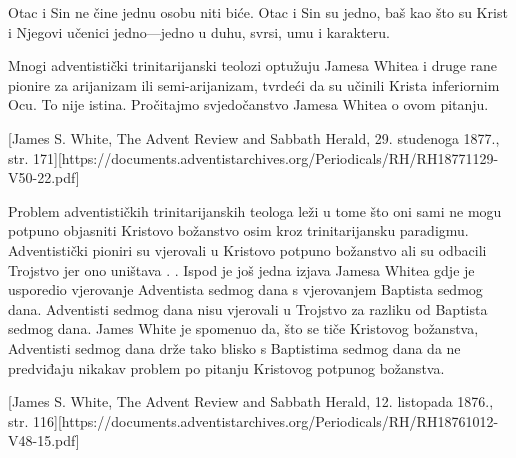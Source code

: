 Otac i Sin ne čine jednu osobu niti biće. Otac i Sin su jedno, baš kao što su Krist i Njegovi učenici jedno—jedno u duhu, svrsi, umu i karakteru.

Mnogi adventistički trinitarijanski teolozi optužuju Jamesa Whitea i druge rane pionire za arijanizam ili semi-arijanizam, tvrdeći da su učinili Krista inferiornim Ocu. To nije istina. Pročitajmo svjedočanstvo Jamesa Whitea o ovom pitanju.


[James S. White, The Advent Review and Sabbath Herald, 29. studenoga 1877., str. 171][https://documents.adventistarchives.org/Periodicals/RH/RH18771129-V50-22.pdf]

Problem adventističkih trinitarijanskih teologa leži u tome što oni sami ne mogu potpuno objasniti Kristovo božanstvo osim kroz trinitarijansku paradigmu. Adventistički pioniri su vjerovali u Kristovo potpuno božanstvo ali su odbacili Trojstvo jer ono uništava . . Ispod je još jedna izjava Jamesa Whitea gdje je usporedio vjerovanje Adventista sedmog dana s vjerovanjem Baptista sedmog dana. Adventisti sedmog dana nisu vjerovali u Trojstvo za razliku od Baptista sedmog dana. James White je spomenuo da, što se tiče Kristovog božanstva, Adventisti sedmog dana drže tako blisko s Baptistima sedmog dana da ne predviđaju nikakav problem po pitanju Kristovog potpunog božanstva.

[James S. White, The Advent Review and Sabbath Herald, 12. listopada 1876., str. 116][https://documents.adventistarchives.org/Periodicals/RH/RH18761012-V48-15.pdf]

